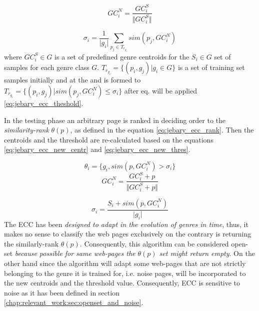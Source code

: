 \begin{equation}\label{eq:jebary_ecc_centroids}
	GC_{i}^{N} = \frac{GC^{S}_{i}}{\Vert GC^{S}_{i}\Vert }
\end{equation}

\begin{equation}\label{eq:jebary_ecc_theshold}
	\sigma_{i} = \frac{1}{\vert g_{i} \vert } \sum_{p_{j} \in T_{r_{g_{i}}}} sim(p_{j}, GC_{i}^{N})
\end{equation}
\noindent
where $GC^{S}_{i} \in G$ is a set of predefined genre centroids for the $S_{i} \in G$ set of samples for each genre class $G$. $T_{r_{g_{i}}} =   \{ (p_{i}, g_{j}) \vert g_{i} \in G  \}$ is a set of training set samples initially and at the and is formed to $T_{r_{g_{i}}} =   \{ (p_{i}, g_{j}) \vert sim(p_{j}, GC^{N}_{i}) \leq \sigma_{i} \}$  after eq. will be applied \ref{eq:jebary_ecc_theshold}.

In the testing phase an arbitrary page is ranked in deciding order to the \textit{similarity-rank} $\theta(p)$, as defined in the equation \ref{eq:jebary_ecc_rank}. Then the centroids and the threshold are re-calculated based on the equations \ref{eq:jebary_ecc_new_centr} and \ref{eq:jebary_ecc_new_thres}. 

\begin{equation}\label{eq:jebary_ecc_rank}
	\theta_{i} = \{g_{i}, sim(p, GC_{i}^{N}) > \sigma_{i}\}
\end{equation}
\begin{equation}\label{eq:jebary_ecc_new_centr}
	GC_{i}^{N} =  \frac{GC^{S}_{i} + p}{\Vert GC^{S}_{i}  + p\Vert}
\end{equation}

\begin{equation}\label{eq:jebary_ecc_new_thres}
	\sigma_{i} = \frac{S_{i} +  sim(p, GC_{i}^{N})}{\vert g_{i} \vert}
\end{equation}
The ECC has been \textit{designed to adapt in the evolution of genres in time}, thus, it makes no sense to classify the web pages exclusively on the contrary is returning the similarly-rank $\theta(p)$. Consequently, this algorithm can be considered open-set \textit{because possible for same web-pages the  $\theta(p)$ set might return empty}. On the other hand since the algorithm will adapt some web-pages that are not strictly belonging to the genre it is trained for, i.e. noise pages, will be incorporated to the new centroids and the threshold value.  Consequently, ECC is sensitive to noise as it has been defined in section \ref{chap:relevant_work:sec:openset_and_noise}.

